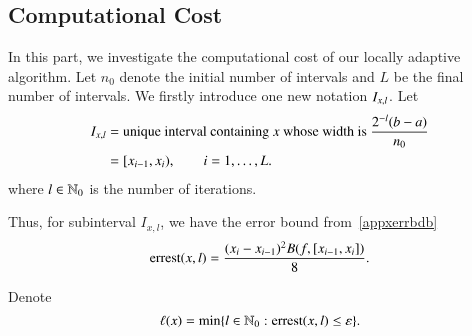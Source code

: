 \subsection{Computational Cost}

In this part, we investigate the computational cost of our locally adaptive algorithm. Let $n_0$ denote the initial number of intervals and $L$ be the final number of intervals. We firstly introduce one new notation $I_{x,l}$. Let
\begin{align*}
I_{x,l} & = \text{unique interval containing $x$ whose width is $\frac{2^{-l}(b-a)}{n_0}$}\\
& = [x_{i-1},x_i), \qquad i =1,\ldots,L.
\end{align*}
where $l \in \mathbb{N}_{0}$ is the number of iterations.

Thus, for subinterval $I_{x,l}$, we have the error bound from~\eqref{appxerrbdb}
$$\operatorname{errest}(x,l)=\frac{(x_i - x_{i-1})^2B(f,[x_{i-1},x_i])}{8}.$$

Denote
\begin{equation}\label{eqn:defofsmallellx}
\ell(x) = \min \{ l \in \mathbb{N}_{0} : \operatorname{errest}(x,l) \le \varepsilon\}.
\end{equation}

